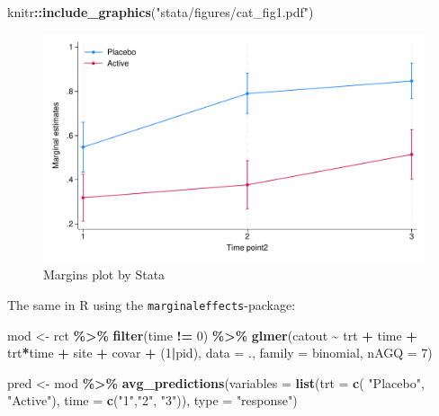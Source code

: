 \documentclass[
]{book}
\newenvironment{Shaded}{\begin{snugshade}}{\end{snugshade}}
\newcommand{\AttributeTok}[1]{\textcolor[rgb]{0.13,0.29,0.53}{#1}}
\newcommand{\DecValTok}[1]{\textcolor[rgb]{0.00,0.00,0.81}{#1}}
\newcommand{\FunctionTok}[1]{\textcolor[rgb]{0.13,0.29,0.53}{\textbf{#1}}}
\newcommand{\NormalTok}[1]{#1}
\newcommand{\OtherTok}[1]{\textcolor[rgb]{0.56,0.35,0.01}{#1}}
\newcommand{\SpecialCharTok}[1]{\textcolor[rgb]{0.81,0.36,0.00}{\textbf{#1}}}
\newcommand{\StringTok}[1]{\textcolor[rgb]{0.31,0.60,0.02}{#1}}
\begin{document}
\begin{Shaded}
\begin{Highlighting}[]
\NormalTok{knitr}\SpecialCharTok{::}\FunctionTok{include\_graphics}\NormalTok{(}\StringTok{"stata/figures/cat\_fig1.pdf"}\NormalTok{)}
\end{Highlighting}
\end{Shaded}

\begin{figure}
\includegraphics[width=0.85\linewidth]{stata/figures/cat_fig1} \caption{Margins plot by Stata}\label{fig:unnamed-chunk-1}
\end{figure}

The same in R using the \texttt{marginaleffects}-package:

\begin{Shaded}
\begin{Highlighting}[]
\NormalTok{mod }\OtherTok{\textless{}{-}}\NormalTok{ rct }\SpecialCharTok{\%\textgreater{}\%}
  \FunctionTok{filter}\NormalTok{(time }\SpecialCharTok{!=} \DecValTok{0}\NormalTok{) }\SpecialCharTok{\%\textgreater{}\%}
  \FunctionTok{glmer}\NormalTok{(catout }\SpecialCharTok{\textasciitilde{}}\NormalTok{ trt }\SpecialCharTok{+}\NormalTok{ time }\SpecialCharTok{+}\NormalTok{ trt}\SpecialCharTok{*}\NormalTok{time }\SpecialCharTok{+}\NormalTok{ site }\SpecialCharTok{+}\NormalTok{ covar }\SpecialCharTok{+}\NormalTok{ (}\DecValTok{1}\SpecialCharTok{|}\NormalTok{pid), }
        \AttributeTok{data =}\NormalTok{ ., }
        \AttributeTok{family =}\NormalTok{ binomial, }
        \AttributeTok{nAGQ =} \DecValTok{7}\NormalTok{)}

\NormalTok{pred }\OtherTok{\textless{}{-}}\NormalTok{ mod }\SpecialCharTok{\%\textgreater{}\%} 
  \FunctionTok{avg\_predictions}\NormalTok{(}\AttributeTok{variables =} \FunctionTok{list}\NormalTok{(}\AttributeTok{trt =} \FunctionTok{c}\NormalTok{( }\StringTok{"Placebo"}\NormalTok{, }\StringTok{"Active"}\NormalTok{), }\AttributeTok{time =} \FunctionTok{c}\NormalTok{(}\StringTok{"1"}\NormalTok{,}\StringTok{"2"}\NormalTok{, }\StringTok{"3"}\NormalTok{)), }\AttributeTok{type =} \StringTok{"response"}\NormalTok{) }
\end{Highlighting}
\end{Shaded}
\end{document}
